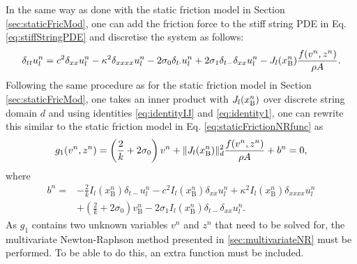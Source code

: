In the same way as done with the static friction model in Section \ref{sec:staticFricMod}, one can add the friction force to the stiff string PDE in Eq. \eqref{eq:stiffStringPDE} and discretise the system as follows:
%
\begin{equation}\label{eq:elastoStiffStringFDS}
    \delta_{tt} u_l^n = c^2 \delta_{xx} u_l^n - \kappa^2 \delta_{xxxx} u_l^n - 2 \sigma_{0} \delta_{t\cdot} u_l^n + 2 \sigma_{1}\delta_{t-}\delta_{xx} u_l^n - J_l(x_{\text{B}}^n)\frac{f(v^n,z^n)}{\rho A}.
\end{equation}
Following the same procedure as for the static friction model in Section \ref{sec:staticFricMod}, one takes an inner product with $J_l(x_{\text{B}}^n)$ over discrete string domain $d$ and using identities \eqref{eq:identityIJ} and \eqref{eq:identity1}, one can rewrite this similar to the static friction model in Eq. \eqref{eq:staticFrictionNRfunc} as
%
\begin{equation}\label{eq:elastog1}
    g_1(v^n,z^n) = \left(\frac{2}{k} + 2\sigma_{0}\right)v^n + \lVert J_l(x_{\text{B}}^n)\rVert_d^2\frac{f(v^n,z^n)}{\rho A}+ b^n= 0,
\end{equation}
where
\begin{align*}
    b^n =&-\frac{2}{k}I_l(x_\text{B}^n)\delta_{t-}u_l^n - c^2 I_l(x_\text{B}^n)\delta_{xx} u_l^n +\kappa^2I_l(x_\text{B}^n)\delta_{xxxx} u_l^n\\
    &+\left(\frac{2}{k}+ 2\sigma_0\right)v_\text{B}^n-2\sigma_1I_l(x_\text{B}^n)\delta_{t-}\delta_{xx}u_l^n.
\end{align*}
As $g_1$ contains two unknown variables $v^n$ and $z^n$ that need to be solved for, the multivariate Newton-Raphson method presented in \ref{sec:multivariateNR} must be performed. To be able to do this, an extra function must be included. 

